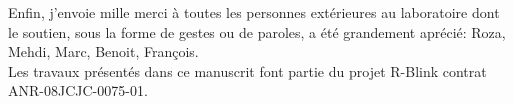 Enfin, j'envoie mille merci à toutes les personnes extérieures au laboratoire dont le soutien, sous la
forme de gestes ou de paroles, a été grandement aprécié:
Roza, Mehdi, Marc, Benoit, François.\\

\noindent Les travaux présentés dans ce manuscrit font partie
du projet R-Blink contrat ANR-08JCJC-0075-01.\\

